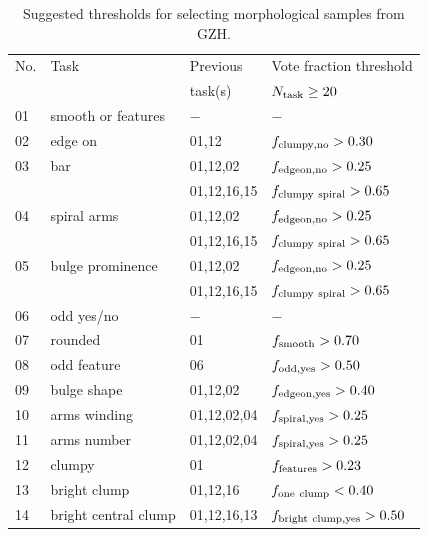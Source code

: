\documentclass[a4paper,fleqn,usenatbib]{mnras}
\begin{document}
\begin{table}
\caption{Suggested thresholds for selecting morphological samples from GZH. \label{tbl:thresholds}}
\begin{tabular}{llll}
\hline\hline
No.      &  Task                & Previous         & Vote fraction threshold            \\
         &                      & task(s)          & $N_{\rm task} \ge 20$              \\
\hline
01       & smooth or features   & $-$              & $-$                                \\
02       & edge on              & 01,12            & $f_{\rm clumpy,no}>0.30$           \\
03       & bar                  & 01,12,02         & $f_{\rm edgeon,no}>0.25$           \\
         &                      & 01,12,16,15      & $f_{\rm clumpy~spiral}>0.65$       \\
04       & spiral arms          & 01,12,02         & $f_{\rm edgeon,no}>0.25$           \\
         &                      & 01,12,16,15      & $f_{\rm clumpy~spiral}>0.65$       \\
05       & bulge prominence     & 01,12,02         & $f_{\rm edgeon,no}>0.25$           \\
         &                      & 01,12,16,15      & $f_{\rm clumpy~spiral}>0.65$       \\
06       & odd yes/no           & $-$              & $-$                                \\
07       & rounded              & 01               & $f_{\rm smooth}>0.70$              \\
08       & odd feature          & 06               & $f_{\rm odd,yes}> 0.50$            \\
09       & bulge shape          & 01,12,02         & $f_{\rm edgeon,yes}>0.40$          \\
10       & arms winding         & 01,12,02,04      & $f_{\rm spiral,yes}>0.25$          \\
11       & arms number          & 01,12,02,04      & $f_{\rm spiral,yes}>0.25$          \\
12       & clumpy               & 01               & $f_{\rm features}>0.23$            \\
13       & bright clump         & 01,12,16         & $f_{\rm one~clump}< 0.40$          \\
14       & bright central clump & 01,12,16,13      & $f_{\rm bright~clump,yes}>0.50$    \\

\end{tabular}
\end{table}
\end{document}
